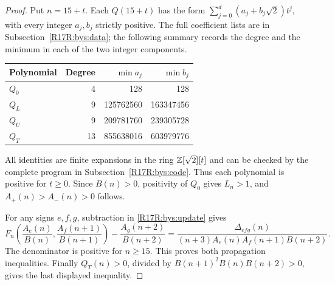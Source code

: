 \documentclass[11pt,a4paper]{article}
\begin{document}
\begin{proof}
Put $n=15+t$. Each $Q(15+t)$ has the form
$\sum_{j=0}^d(a_j+b_j\sqrt2)t^j$, with every integer $a_j,b_j$
strictly positive. The full coefficient lists are in
Subsection~\ref{R17R:bys:data}; the following summary records the degree
and the minimum in each of the two integer components.
\begin{center}
\begin{tabular}{lrrr}
\toprule
Polynomial & Degree & $\min a_j$ & $\min b_j$\\\midrule
$Q_0$ & 4 & 128 & 128\\
$Q_L$ & 9 & 125762560 & 163347456\\
$Q_U$ & 9 & 209781760 & 239305728\\
$Q_T$ & 13 & 855638016 & 603979776\\\bottomrule
\end{tabular}
\end{center}
All identities are finite expansions in the ring
$\mathbb Z[\sqrt2][t]$ and can be checked by the complete program in
Subsection~\ref{R17R:bys:code}. Thus each polynomial is positive for $t\ge0$.
Since $B(n)>0$, positivity of $Q_0$ gives $L_n>1$, and
$A_+(n)>A_-(n)>0$ follows.

For any signs $e,f,g$, subtraction in \eqref{R17R:bys:update} gives
\[
 F_n\!\left(\frac{A_e(n)}{B(n)},
              \frac{A_f(n+1)}{B(n+1)}\right)
 -\frac{A_g(n+2)}{B(n+2)}
 =\frac{\Delta_{efg}(n)}
 {(n+3)A_e(n)A_f(n+1)B(n+2)}.
\]
The denominator is positive for $n\ge15$. This proves both propagation
inequalities. Finally $Q_T(n)>0$, divided by
$B(n+1)^2B(n)B(n+2)>0$, gives the last displayed inequality.
\end{proof}
\end{document}

